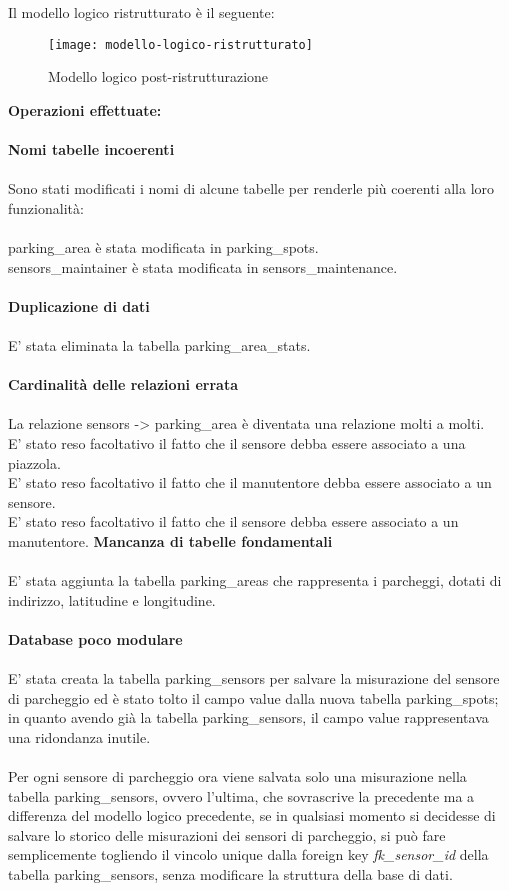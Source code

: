 Il modello logico ristrutturato è il seguente:
\begin{figure}[H]
  \centering
  \texttt{[image: modello-logico-ristrutturato]}
  \caption{Modello logico post-ristrutturazione}
\end{figure}
\leavevmode\newline
\textbf{Operazioni effettuate:}
\\\\
\textbf{Nomi tabelle incoerenti}
\\\\
Sono stati modificati i nomi di alcune tabelle per renderle più coerenti alla loro funzionalità:
\\\\
parking\_area è stata modificata in parking\_spots.
\\
sensors\_maintainer è stata modificata in sensors\_maintenance.
\\\\
\textbf{Duplicazione di dati}
\\\\
E' stata eliminata la tabella parking\_area\_stats.
\\\\
\textbf{Cardinalità delle relazioni errata}
\\\\
La relazione sensors -> parking\_area è diventata una relazione molti a molti.
\\
E' stato reso facoltativo il fatto che il sensore debba essere associato a una piazzola.
\\
E' stato reso facoltativo il fatto che il manutentore debba essere associato a un sensore.
\\
E' stato reso facoltativo il fatto che il sensore debba essere associato a un manutentore.
\clearpage
\leavevmode\newline
\textbf{Mancanza di tabelle fondamentali}
\\\\
E' stata aggiunta la tabella parking\_areas che rappresenta i parcheggi, dotati di indirizzo, latitudine e 
longitudine.
\\\\
\textbf{Database poco modulare}
\\\\
E' stata creata la tabella parking\_sensors per salvare la misurazione del sensore di parcheggio ed è
stato tolto il campo value dalla nuova tabella parking\_spots; in quanto avendo già la tabella parking\_sensors,
il campo value rappresentava una ridondanza inutile.
\\\\
Per ogni sensore di parcheggio ora viene salvata solo una misurazione nella tabella parking\_sensors, ovvero
l'ultima, che sovrascrive la precedente ma a differenza del modello logico precedente, se in qualsiasi momento
si decidesse di salvare lo storico delle misurazioni dei sensori di parcheggio, si può fare semplicemente togliendo
il vincolo unique dalla foreign key \textit{fk\_sensor\_id} della tabella parking\_sensors, senza modificare la struttura della base di dati.